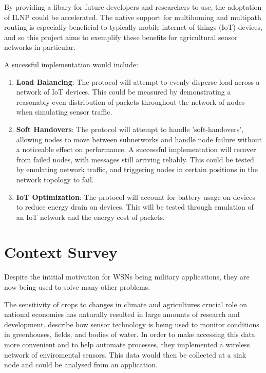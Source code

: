 \documentclass[12pt]{article}
\begin{document}
By providing a libary for future developers and researchers to use, the adoptation of ILNP could be accelerated. The native support for multihoming and multipath routing is especially beneficial to typically mobile internet of things (IoT) devices, and so this project aims to exemplify these benefits for agricultural sensor networks in particular. 

\vspace{\baselineskip}
\noindent A sucessful implementation would include:

\begin{enumerate}
	\item \textbf{Load Balancing}: The protocol will attempt to evenly disperse load across a network of IoT
devices. This could be measured by demonstrating a reasonably even distribution of packets throughout the network of nodes when simulating sensor traffic. 
	\item \textbf{Soft Handovers}: The protocol will attempt to handle ’soft-handovers’, allowing nodes to
move between subnetworks and handle node failure without a noticeable effect on performance. A successful implementation will recover from failed nodes, with messages still arriving reliably. This could be tested by emulating network traffic, and triggering nodes in certain positions in the network topology to fail.

\item \textbf{IoT Optimization}: The protocol will account for battery usage on devices to reduce energy drain
on devices. This will be tested through emulation of an IoT network and the energy cost of packets.
\end{enumerate}

\pagebreak
\section{Context Survey}

Despite the intitial motivation for WSNs being military applications, they are now being used to solve many other problems.

The sensitivity of crops to changes in climate and agricultures crucial role on national economies has naturally resulted in large amounts of research and development. \cite{agrisensor} describe how sensor technology is being used to monitor conditions in greenhouses, fields, and bodies of water. In order to make accessing this data more convenient and to help automate processes, they implemented a wireless network of enviromental sensors. This data would then be collected at a sink node and could be analysed from an application. 
\end{document}
